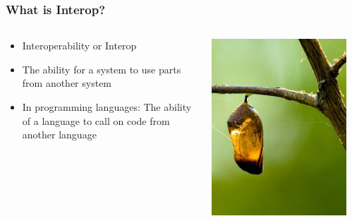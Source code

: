 \documentclass{beamer}
\begin{document}
\begin{frame}
  \frametitle{What is Interop?}
  
  \begin{columns}
  \begin{column}{0.6\textwidth}
  \begin{itemize}
  	\item Interoperability or Interop
  	\item The ability for a system to use parts from another system
	\item In programming languages: The ability of a language to call on code from another language
  \end{itemize}
  \end{column}
  
  \begin{column}{0.4\textwidth}
   \includegraphics[width=0.90\textwidth]{graphics/Empty_cocoon_crop_by_Bluedrakon_from_Flickr.jpg}
       \\
  \end{column}
  \end{columns}
\end{frame}
\end{document}
